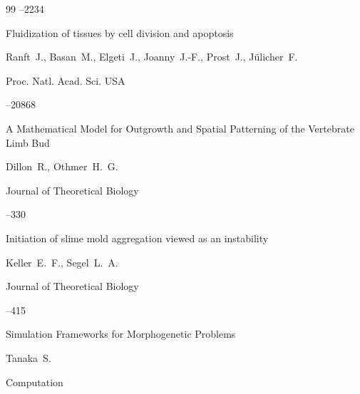 \begin{thebibliography}{99}
--2234





\paper Fluidization of tissues by cell division and apoptosis

\by    Ranft~J., Basan~M.,  Elgeti~J., Joanny~J.-F., Prost~J., J\"ulicher~F.

\jour    Proc. Natl. Acad. Sci. USA




--20868


 


\paper A Mathematical Model for Outgrowth and Spatial Patterning of the Vertebrate Limb Bud

\by   Dillon~R., Othmer~H.~G.

\jour   Journal of Theoretical Biology




--330


 


\paper  Initiation of slime mold aggregation viewed as an instability

\by    Keller~E.~F., Segel~L.~A.

\jour   Journal of Theoretical Biology




--415


 


\paper  Simulation Frameworks for Morphogenetic Problems

\by    Tanaka~S.

\jour   Computation



\end{thebibliography}
